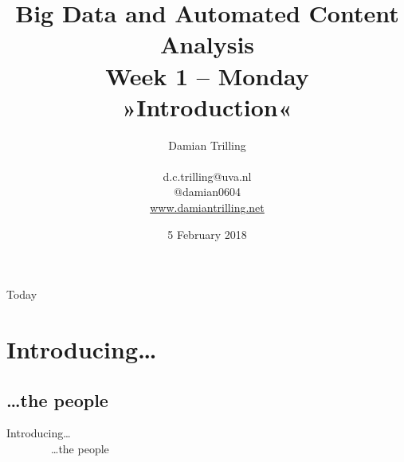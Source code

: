 \documentclass{beamer}
\begin{document}
\title[Big Data and Automated Content Analysis]{\textbf{Big Data and Automated Content Analysis} \\ Week 1 -- Monday \\ »Introduction«}
\author[Damian Trilling]{Damian Trilling \\ ~ \\ \footnotesize{d.c.trilling@uva.nl \\@damian0604} \\ \url{www.damiantrilling.net}}
\date{5 February 2018}


\begin{frame}{}
\titlepage
\end{frame}

\begin{frame}{Today}
\tableofcontents
\end{frame}



\section{Introducing\ldots}
\subsection{\ldots the people}

\begin{frame}
	Introducing\ldots \\
	~~~~~~~~\ldots the people
\end{frame}
\end{document}
